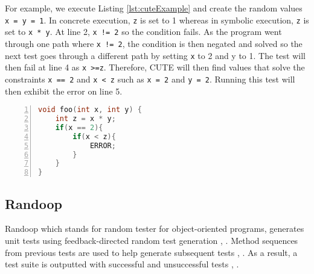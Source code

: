 For example, we execute Listing \ref{lst:cuteExample} and create the random values \texttt{x = y = 1}. 
In concrete execution, \texttt{z} is set to 1 whereas in symbolic execution, \texttt{z} is set to \texttt{x * y}.
At line 2, \texttt{x != 2} so the condition fails. 
As the program went through one path where \texttt{x != 2}, the condition is then negated and solved so the next test goes through a different path by setting \texttt{x} to 2 and y to 1. 
The test will then fail at line 4 as \texttt{x >=z}. Therefore, CUTE will then find values that solve the constraints \texttt{x == 2} and \texttt{x < z} such as \texttt{x = 2} and \texttt{y = 2}. 
Running this test will then exhibit the error on line 5. 



\begin{lstlisting}[language=C, tabsize=3, numbers=left,
label={lst:cuteExample}, caption={Example C program}]
void foo(int x, int y) {
	int z = x * y;
	if(x == 2){
		if(x < z){
			ERROR;
		}
	}
}
\end{lstlisting}

\subsection{Randoop}
Randoop which stands for random tester for object-oriented programs, generates unit tests using feedback-directed random test generation \cite{randoopAll}, \cite{randoopJava}. Method sequences from previous tests are used to help generate subsequent tests \cite{randoopAll}, \cite{randoopJava}.
As a result, a test suite is outputted with successful and unsuccessful tests \cite{randoopAll}, \cite{randoopJava}.

